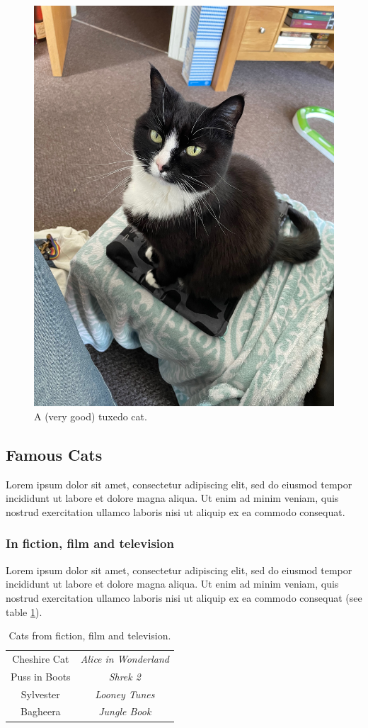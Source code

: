 \documentclass{article}
\begin{document}
\begin{figure}[H]
    \centering
    \includegraphics[width=0.5\linewidth]{tuxedo.jpeg}
    \caption{A (very good) tuxedo cat.}
    \label{fig:tuxedo}
\end{figure}

\subsection{Famous Cats}

Lorem ipsum dolor sit amet, consectetur adipiscing elit, sed do eiusmod tempor incididunt ut labore et dolore magna aliqua. Ut enim ad minim veniam, quis nostrud exercitation ullamco laboris nisi ut aliquip ex ea commodo consequat. 

\subsubsection{In fiction, film and television}

Lorem ipsum dolor sit amet, consectetur adipiscing elit, sed do eiusmod tempor incididunt ut labore et dolore magna aliqua. Ut enim ad minim veniam, quis nostrud exercitation ullamco laboris nisi ut aliquip ex ea commodo consequat (see table \ref{tab:example}). 

\begin{table}[h]
    \centering
    \begin{tabular}{|c|c|}
    \hline
       Cheshire Cat  & \textit{Alice in Wonderland} \\
       Puss in Boots  & \textit{Shrek 2} \\
       Sylvester & \textit{Looney Tunes} \\
       Bagheera & \textit{Jungle Book} \\
       \hline
    \end{tabular}
    \caption{Cats from fiction, film and television.}
    \label{tab:example}
\end{table}
\end{document}
